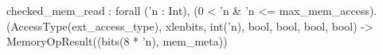 checked_mem_read : forall ('n : Int), (0 < 'n & 'n <= max_mem_access).
  (AccessType(ext_access_type), xlenbits, int('n), bool, bool, bool, bool) -> MemoryOpResult((bits(8 * 'n), mem_meta))